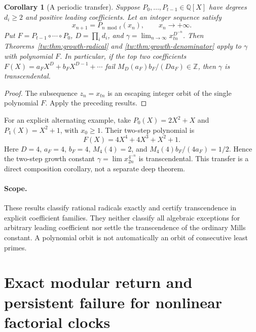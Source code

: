 \documentclass[11pt,a4paper]{article}
\newtheorem{corollary}[theorem]{Corollary}
\theoremstyle{definition}
\theoremstyle{remark}
\numberwithin{equation}{section}
\begin{document}
\begin{corollary}[A periodic transfer]\label{tw:cor:growth-periodic}
Suppose $P_0,\ldots,P_{t-1}\in\mathbb Q[X]$ have degrees
$d_i\ge2$ and positive leading coefficients.  Let an integer sequence
satisfy
\[
 x_{n+1}=P_{n\bmod t}(x_n),\qquad x_n\longrightarrow+\infty.
\]
Put $F=P_{t-1}\circ\cdots\circ P_0$, $D=\prod_i d_i$, and
$\gamma=\lim_{n\to\infty}x_{tn}^{D^{-n}}$.
Then Theorems~\ref{tw:thm:growth-radical} and
\ref{tw:thm:growth-denominator} apply to $\gamma$ with polynomial $F$.
In particular, if the top two coefficients $F(X)=a_FX^D+b_FX^{D-1}
+\cdots$ fail
$M_D(a_F)b_F/(Da_F)\in\mathbb Z$, then $\gamma$ is transcendental.
\end{corollary}

\begin{proof}
The subsequence $z_n=x_{tn}$ is an escaping integer orbit of the
single polynomial $F$.  Apply the preceding results.
\end{proof}

For an explicit alternating example, take $P_0(X)=2X^2+X$ and
$P_1(X)=X^2+1$, with $x_0\ge1$.  Their two-step polynomial is
\[
 F(X)=4X^4+4X^3+X^2+1.
\]
Here $D=4$, $a_F=4$, $b_F=4$, $M_4(4)=2$, and
$M_4(4)b_F/(4a_F)=1/2$.  Hence the two-step growth constant
$\gamma=\lim x_{2n}^{4^{-n}}$ is transcendental.  This transfer
is a direct composition corollary, not a separate deep theorem.

\paragraph{Scope.}
These results classify rational radicals exactly and certify
transcendence in explicit coefficient families.  They neither classify
all algebraic exceptions for arbitrary leading coefficient nor settle
the transcendence of the ordinary Mills constant.  A polynomial orbit
is not automatically an orbit of consecutive least primes.


\section{Exact modular return and persistent failure for nonlinear factorial clocks}
\label{tw:sec:factorial-nonlinear-return}
\end{document}
